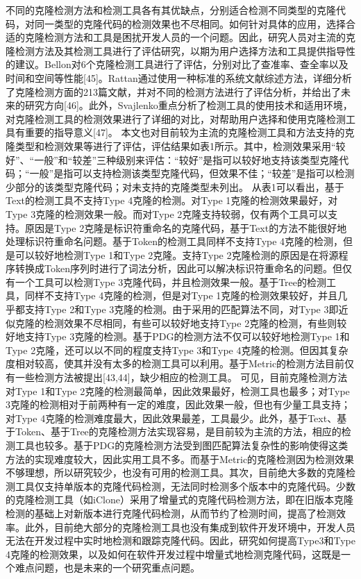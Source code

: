 
不同的克隆检测方法和检测工具各有其优缺点，分别适合检测不同类型的克隆代码，对同一类型的克隆代码的检测效果也不尽相同。如何针对具体的应用，选择合适的克隆检测方法和工具是困扰开发人员的一个问题。因此，研究人员对主流的克隆检测方法及其检测工具进行了评估研究，以期为用户选择方法和工具提供指导性的建议。Bellon对6个克隆检测工具进行了评估，分别对比了查准率、查全率以及时间和空间等性能[45]。Rattan通过使用一种标准的系统文献综述方法，详细分析了克隆检测方面的213篇文献，并对不同的检测方法进行了评估分析，并给出了未来的研究方向[46]。此外，Svajlenko重点分析了检测工具的使用技术和适用环境，对克隆检测工具的检测效果进行了详细的对比，对帮助用户选择和使用克隆检测工具有重要的指导意义[47]。
本文也对目前较为主流的克隆检测工具和方法支持的克隆类型和检测效果等进行了评估，评估结果如表1所示。其中，检测效果采用“较好”、“一般”和“较差”三种级别来评估：“较好”是指可以较好地支持该类型克隆代码；“一般”是指可以支持检测该类型克隆代码，但效果不佳；“较差”是指可以检测少部分的该类型克隆代码；对未支持的克隆类型未列出。
从表1可以看出，基于Text的检测工具不支持Type 4克隆的检测。对Type 1克隆的检测效果最好，对Type 3克隆的检测效果一般。而对Type 2克隆支持较弱，仅有两个工具可以支持。原因是Type 2克隆是标识符重命名的克隆代码，基于Text的方法不能很好地处理标识符重命名问题。基于Token的检测工具同样不支持Type 4克隆的检测，但是可以较好地检测Type 1和Type 2克隆。支持Type 2克隆检测的原因是在将源程序转换成Token序列时进行了词法分析，因此可以解决标识符重命名的问题。但仅有一个工具可以检测Type 3克隆代码，并且检测效果一般。基于Tree的检测工具，同样不支持Type 4克隆的检测，但是对Type 1克隆的检测效果较好，并且几乎都支持Type 2和Type 3克隆的检测。由于采用的匹配算法不同，对Type 3即近似克隆的检测效果不尽相同，有些可以较好地支持Type 2克隆的检测，有些则较好地支持Type 3克隆的检测。基于PDG的检测方法不仅可以较好地检测Type 1和Type 2克隆，还可以以不同的程度支持Type 3和Type 4克隆的检测。但因其复杂度相对较高，使其并没有太多的检测工具可以利用。基于Metric的检测方法目前仅有一些检测方法被提出[43,44]，缺少相应的检测工具。
可见，目前克隆检测方法对Type 1和Type 2克隆的检测最简单，因此效果最好，检测工具也最多；对Type 3克隆的检测相对于前两种有一定的难度，因此效果一般，但也有少量工具支持；对Type 4克隆的检测难度最大，因此效果最差，工具最少。此外，基于Text、基于Token、基于Tree的克隆检测方法实现容易，是目前较为主流的方法，相应的检测工具也较多。基于PDG的克隆检测方法受到图匹配算法复杂性的影响使得这类方法的实现难度较大，因此实用工具不多。而基于Metric的克隆检测因为检测效果不够理想，所以研究较少，也没有可用的检测工具。其次，目前绝大多数的克隆检测工具仅支持单版本的克隆代码检测，无法同时检测多个版本中的克隆代码。少数的克隆检测工具（如iClone）采用了增量式的克隆代码检测方法，即在旧版本克隆检测的基础上对新版本进行克隆代码检测，从而节约了检测时间，提高了检测效率。此外，目前绝大部分的克隆检测工具也没有集成到软件开发环境中，开发人员无法在开发过程中实时地检测和跟踪克隆代码。因此，研究如何提高Type3和Type 4克隆的检测效果，以及如何在软件开发过程中增量式地检测克隆代码，这既是一个难点问题，也是未来的一个研究重点问题。

